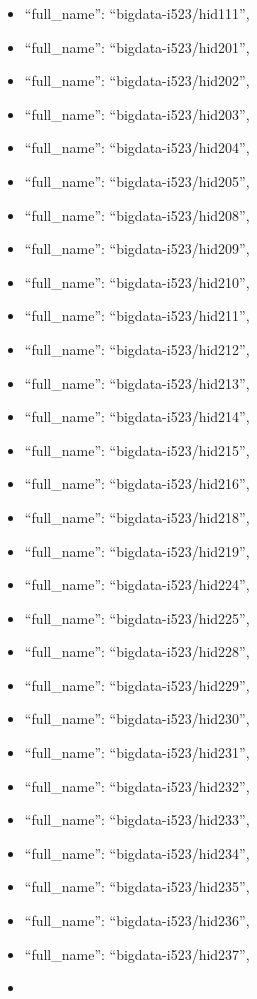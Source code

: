 \begin{itemize}
\item
  ``full\_name'': ``bigdata-i523/hid111'',
\item
  ``full\_name'': ``bigdata-i523/hid201'',
\item
  ``full\_name'': ``bigdata-i523/hid202'',
\item
  ``full\_name'': ``bigdata-i523/hid203'',
\item
  ``full\_name'': ``bigdata-i523/hid204'',
\item
  ``full\_name'': ``bigdata-i523/hid205'',
\item
  ``full\_name'': ``bigdata-i523/hid208'',
\item
  ``full\_name'': ``bigdata-i523/hid209'',
\item
  ``full\_name'': ``bigdata-i523/hid210'',
\item
  ``full\_name'': ``bigdata-i523/hid211'',
\item
  ``full\_name'': ``bigdata-i523/hid212'',
\item
  ``full\_name'': ``bigdata-i523/hid213'',
\item
  ``full\_name'': ``bigdata-i523/hid214'',
\item
  ``full\_name'': ``bigdata-i523/hid215'',
\item
  ``full\_name'': ``bigdata-i523/hid216'',
\item
  ``full\_name'': ``bigdata-i523/hid218'',
\item
  ``full\_name'': ``bigdata-i523/hid219'',
\item
  ``full\_name'': ``bigdata-i523/hid224'',
\item
  ``full\_name'': ``bigdata-i523/hid225'',
\item
  ``full\_name'': ``bigdata-i523/hid228'',
\item
  ``full\_name'': ``bigdata-i523/hid229'',
\item
  ``full\_name'': ``bigdata-i523/hid230'',
\item
  ``full\_name'': ``bigdata-i523/hid231'',
\item
  ``full\_name'': ``bigdata-i523/hid232'',
\item
  ``full\_name'': ``bigdata-i523/hid233'',
\item
  ``full\_name'': ``bigdata-i523/hid234'',
\item
  ``full\_name'': ``bigdata-i523/hid235'',
\item
  ``full\_name'': ``bigdata-i523/hid236'',
\item
  ``full\_name'': ``bigdata-i523/hid237'',
\item

\end{itemize}

